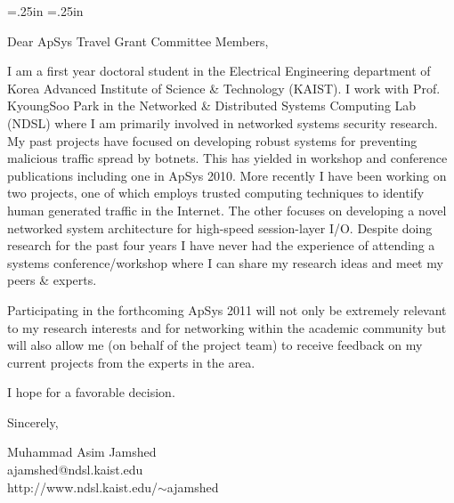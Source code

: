 
\oddsidemargin=.25in
\evensidemargin=.25in
\textwidth=6in
\topmargin=0in
\textheight=9in

\parindent=0in
\pagestyle{empty}





Dear ApSys Travel Grant Committee Members,
\vs

I am a first year doctoral student in the Electrical Engineering 
department of Korea Advanced Institute of Science \& Technology (KAIST).
I work with Prof. KyoungSoo Park in the Networked \& Distributed Systems
Computing Lab (NDSL) where I am primarily involved in networked systems
security research. My past projects have focused on developing robust 
systems for preventing malicious traffic spread by botnets. This has 
yielded in workshop and conference publications including one 
in ApSys 2010. More recently I have been working on two projects, one of 
which employs trusted computing techniques to identify human generated 
traffic in the Internet. The other focuses on developing a novel 
networked system architecture for high-speed session-layer I/O.
Despite doing research for the past four years I have never had the 
experience of attending a systems conference/workshop where I can share 
my research ideas and meet my peers \& experts.
\vs

Participating in the forthcoming ApSys 2011 will not only be extremely 
relevant to my research interests and for networking within the academic 
community but will also allow me (on behalf of the project team) to 
receive feedback on my current projects from the experts in the area.
\vs

I hope for a favorable decision.
\vs

Sincerely,
\vs

Muhammad Asim Jamshed \\
ajamshed@ndsl.kaist.edu \\
http://www.ndsl.kaist.edu/$\sim$ajamshed \\

